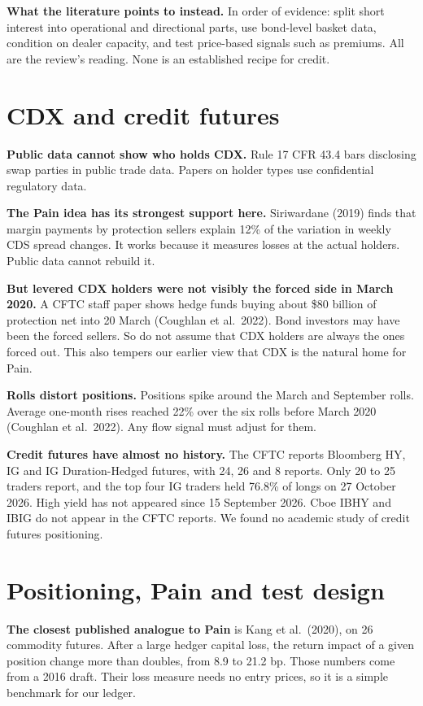 \documentclass[11pt]{article}
\begin{document}
\textbf{What the literature points to instead.} In order of evidence: split short interest into operational and directional parts, use bond-level basket data, condition on dealer capacity, and test price-based signals such as premiums. All are the review's reading. None is an established recipe for credit.

\section{CDX and credit futures}
\textbf{Public data cannot show who holds CDX.} Rule 17 CFR 43.4 bars disclosing swap parties in public trade data. Papers on holder types use confidential regulatory data.

\textbf{The Pain idea has its strongest support here.} Siriwardane (2019) finds that margin payments by protection sellers explain 12\% of the variation in weekly CDS spread changes. It works because it measures losses at the actual holders. Public data cannot rebuild it.

\textbf{But levered CDX holders were not visibly the forced side in March 2020.} A CFTC staff paper shows hedge funds buying about \$80 billion of protection net into 20 March (Coughlan et al.\ 2022). Bond investors may have been the forced sellers. So do not assume that CDX holders are always the ones forced out. This also tempers our earlier view that CDX is the natural home for Pain.

\textbf{Rolls distort positions.} Positions spike around the March and September rolls. Average one-month rises reached 22\% over the six rolls before March 2020 (Coughlan et al.\ 2022). Any flow signal must adjust for them.

\textbf{Credit futures have almost no history.} The CFTC reports Bloomberg HY, IG and IG Duration-Hedged futures, with 24, 26 and 8 reports. Only 20 to 25 traders report, and the top four IG traders held 76.8\% of longs on 27 October 2026. High yield has not appeared since 15 September 2026. Cboe IBHY and IBIG do not appear in the CFTC reports. We found no academic study of credit futures positioning.

\section{Positioning, Pain and test design}
\textbf{The closest published analogue to Pain} is Kang et al.\ (2020), on 26 commodity futures. After a large hedger capital loss, the return impact of a given position change more than doubles, from 8.9 to 21.2 bp. Those numbers come from a 2016 draft. Their loss measure needs no entry prices, so it is a simple benchmark for our ledger.
\end{document}
